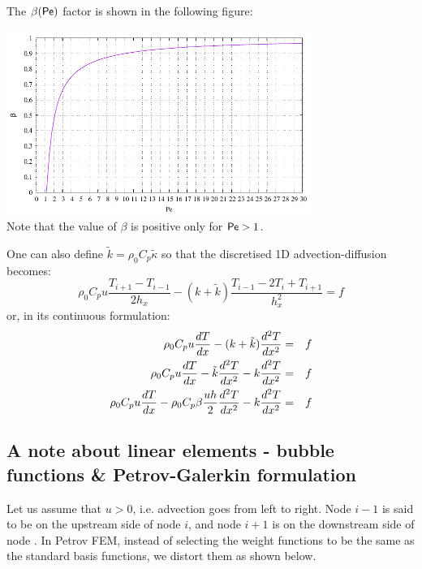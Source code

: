 The $\beta({\mathsf{Pe}})$ factor is shown in the following figure:
\begin{center}
\includegraphics[width=10cm]{images/supg/beta}\\
{\captionfont Note that the value of $\beta$ is positive only for ${\mathsf{Pe}}>1$.}
\end{center}


One can also define $\tilde{k}=\rho_0 C_p \tilde{\kappa}$ so that 
the discretised 1D advection-diffusion becomes:
\begin{equation}
\rho_0 C_p u \frac{T_{i+1}-T_{i-1}}{2h_x}
- (k+ \tilde{k}) \frac{T_{i-1}-2T_i+T_{i+1}}{h_x^2}
= f 
\end{equation}
or, in its continuous formulation:
\begin{eqnarray}
\rho_0 C_p u \frac{dT}{dx} - (k+ \tilde{k}) \frac{d^2T}{dx^2} &=& f \nonumber\\
\rho_0 C_p u \frac{dT}{dx}
- \tilde{k} \frac{d^2T}{dx^2} 
- k \frac{d^2T}{dx^2} &=& f \nonumber\\
\rho_0 C_p u \frac{dT}{dx}
- \rho_0 C_p \beta \frac{u h}{2} \frac{d^2T}{dx^2} 
- k \frac{d^2T}{dx^2} &=& f
\end{eqnarray}





\subsection{A note about linear elements - bubble functions \& Petrov-Galerkin formulation}

Let us assume that $u>0$, i.e. advection goes from left to right. 
Node $i-1$ is said to be on the upstream side of node $i$, and node $i+1$
is on the downstream side of node . In Petrov FEM, instead of selecting the weight functions to be the
same as the standard basis functions, we distort them as shown below.

